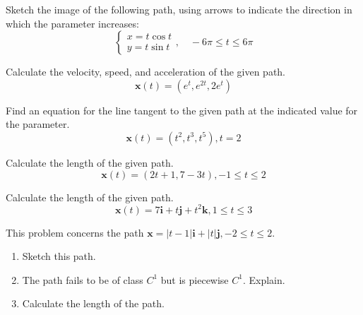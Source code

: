 \documentclass[boxes]{gsypset}
\begin{document}

\begin{problem}[3.1.3]
	Sketch the image of the following path, using
	arrows to indicate the direction in which the parameter increases:
	\[
		\begin{cases}
			x=t\cos t\\
			y=t\sin t
		\end{cases},
		\quad-6\pi\leq t\leq6\pi
	\]
\end{problem}
\begin{solution}
	
\end{solution}

\begin{problem}[3.1.10]
	Calculate the velocity, speed, and acceleration of the given path.
	\[
		\textbf{x}(t)=(e^t,e^{2t},2e^t)
	\]
\end{problem}
\begin{solution}
	
\end{solution}

\begin{problem}[3.1.17]
	Find an equation for the line tangent to the
	given path at the indicated value for the parameter.
	\[
		\textbf{x}(t)=(t^2,t^3,t^5),t=2
	\]
\end{problem}
\begin{solution}
	
\end{solution}

\begin{problem}[3.2.1]
	Calculate the length of the given path.
	\[
		\textbf{x}(t)=(2t+1,7-3t),-1\leq t\leq2
	\]
\end{problem}
\begin{solution}
	
\end{solution}

\begin{problem}[3.2.4]
	Calculate the length of the given path.
	\[
		\textbf{x}(t)=7\textbf{i}+t\textbf{j}+t^2\textbf{k},1\leq t\leq3
	\]
\end{problem}
\begin{solution}
	
\end{solution}

\begin{problem}[3.2.13]
	This problem concerns the path $\textbf{x}=|t-1|\textbf{i}
	+|t|\textbf{j},-2\leq t\leq2$.
	\begin{enumerate}
		\item Sketch this path.
		\item The path fails to be of class $C^1$ but is piecewise $C^1$.
			Explain.
		\item Calculate the length of the path.
	\end{enumerate}
\end{problem}
\begin{solution}
	
\end{solution}
\end{document}
